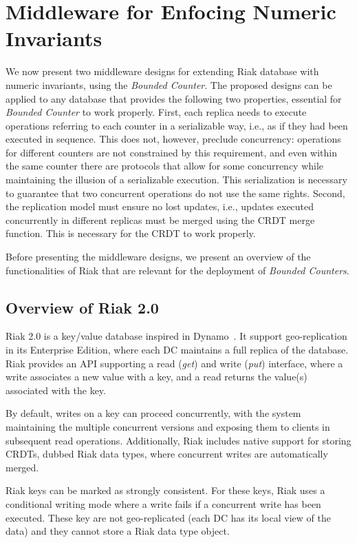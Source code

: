 \documentclass[conference]{IEEEtran}
\newcommand{\InvCounter}{\emph{Bounded Counter}}
\newcommand{\InvCounters}{\emph{Bounded Counters}}
\begin{document}
\section{Middleware for Enfocing Numeric Invariants}\label{sec:deploy:riak}

We now present two middleware designs for extending Riak database with numeric
invariants, using the \InvCounter{}.
The proposed designs can be applied to any database that provides the following
two properties, essential for \InvCounter{} to work properly.
First, each replica needs to execute operations referring to each counter in a serializable way, i.e., as if they had been executed in sequence. This does not, however, preclude concurrency: operations for different counters are not constrained by this requirement, and even within the same counter there are protocols that allow for some concurrency while maintaining the illusion of a serializable execution.
This serialization is necessary to guarantee that two concurrent operations do not use the same
rights.
Second, the replication model must ensure no lost updates, i.e., updates executed
concurrently in different replicas must be merged using the CRDT merge function.
This is necessary for the CRDT to work properly.

Before presenting the middleware designs, we present an overview of the 
functionalities of Riak that are relevant for the deployment of \InvCounters{}.




\subsection{Overview of Riak 2.0}

Riak 2.0 is a key/value database inspired in Dynamo~\cite{dynamo}.
It support geo-replication in its Enterprise Edition, where each DC 
maintains a full replica of the database.
Riak provides an API supporting a read (\emph{get}) and write (\emph{put})
interface, where a
write associates a new value with a key, and a read
returns the value(s) associated with the key.

By default, writes on a key can proceed concurrently, with the system
maintaining the multiple concurrent versions and exposing them to clients
in subsequent read operations.
Additionally, Riak includes native support for storing CRDTs, dubbed Riak data types,
where concurrent writes are automatically merged. 

Riak keys can be marked as strongly consistent. For these keys, 
Riak uses a conditional writing mode where a write fails if a 
concurrent write has been executed.
These key are not geo-replicated (each DC has its local view
of the data) and they cannot store a Riak data type object.
\end{document}
